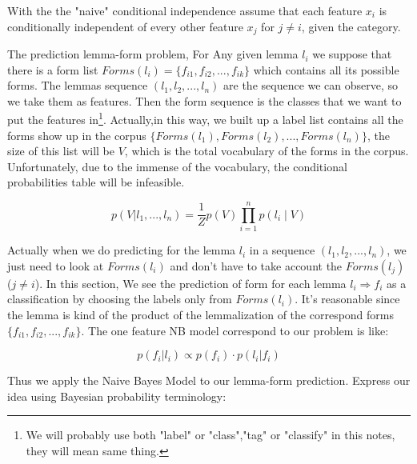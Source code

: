 \documentclass[a4paper]{article}
\begin{document}
With the the "naive" conditional independence assume that each feature $x_{i}$ is conditionally independent of every other feature $x_{j}$ for $j \neq i$, given the category. 

The prediction lemma-form problem, For Any given lemma $l_i$ we suppose that there is a form list $Forms(l_i)=\{f_{i1},f_{i2},...,f_{ik}\}$ which contains all its possible forms. The lemmas sequence $(l_1,l_2,...,l_n)$ are the sequence we can observe, so we take them as features. Then the form sequence is the classes that we want to put the features in\footnote{We will probably use both "label" or "class","tag" or "classify" in this notes, they will mean same thing.}. Actually,in this way,  we built up a label list contains all the forms show up in the corpus $\{Forms(l_1),Forms(l_2),..., Forms(l_n)\}$, the size of this list will be $V$, which is the total vocabulary of the forms in the corpus. Unfortunately, due to the immense of the vocabulary, the conditional probabilities table will be infeasible.

\[p(V|l_1,...,l_n) = \frac{1}{Z} p(V) \prod _{i=1}^{n}p(l_i \mid V) \]

Actually when we do predicting for the lemma $l_i$ in a sequence $(l_1,l_2,...,l_n)$, we just need to look at $Forms(l_i)$ and don't have to take account the $Forms(l_j)$ ($j \neq i$). In this section, We see the prediction of form for each lemma $l_i  \Longrightarrow f_i$ as a classification by choosing the labels only from $Forms(l_i)$. It's reasonable since the lemma is kind of the product of the lemmalization of the correspond forms $\{f_{i1},f_{i2},...,f_{ik}\}$. The one feature NB model correspond to our problem is like:

\[p(f_i|l_i) \propto p(f_i) \cdot  p(l_i|f_i)\]

Thus we apply the Naive Bayes Model to our lemma-form prediction. Express our idea using Bayesian probability terminology:
\end{document}
